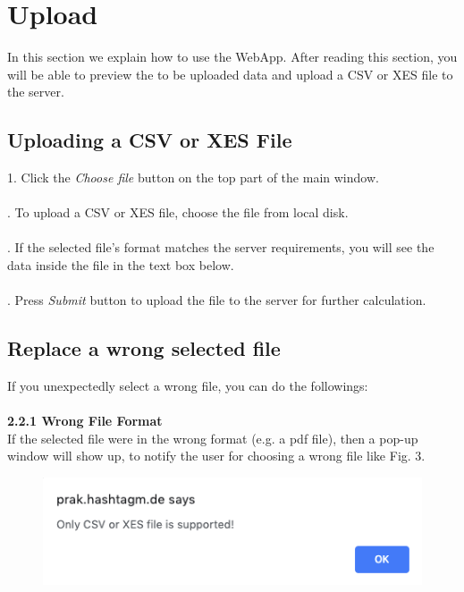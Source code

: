\documentclass[runningheads]{llncs}
\begin{document}
\section{Upload}

In this section we explain how to use the WebApp. After reading this section, you will be able to preview the to be uploaded data and upload a CSV or XES file to the server.

\subsection{Uploading a CSV or XES File}

1. Click the \textit{Choose file} button on the top part of the main window.\\\\
. To upload a CSV or XES file, choose the file from local disk.\\\\
. If the selected file's format matches the server requirements, you will see the data inside the file in the text box below.\\\\
. Press \textit{Submit} button to upload the file to the server for further calculation.

\subsection{Replace a wrong selected file}
If you unexpectedly select a wrong file, you can do the followings:\\\\
\noindent
\textbf{2.2.1 Wrong File Format\\}
If the selected file were in the wrong format (e.g. a pdf file), then a pop-up window will show up, to notify the user for choosing a wrong file like Fig. 3.\\
\begin{figure}[h]	
	\centering
	\includegraphics[scale=0.5]{wrong.png}
	\caption{}
	\label{fig:label}
\end{figure}
\end{document}
